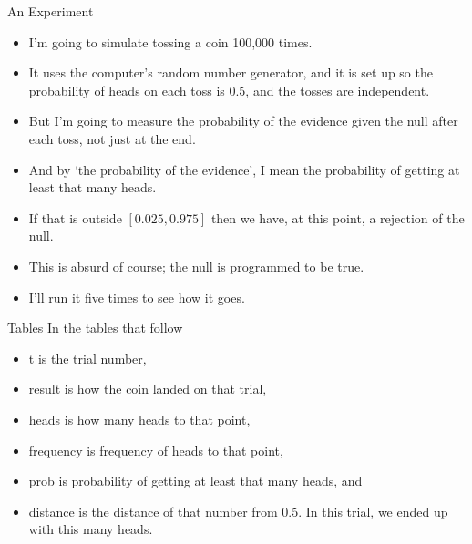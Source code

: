 \documentclass[
  ignorenonframetext,
]{beamer}
\providecommand{\tightlist}{%
  \setlength{\itemsep}{0pt}\setlength{\parskip}{0pt}}
\renewcommand{\,}{\text{, }}
\begin{document}
\begin{frame}{An Experiment}
\protect\hypertarget{an-experiment-1}{}
\begin{itemize}
\tightlist
\item
  I'm going to simulate tossing a coin 100,000 times.
\item
  It uses the computer's random number generator, and it is set up so
  the probability of heads on each toss is 0.5, and the tosses are
  independent.
\item
  But I'm going to measure the probability of the evidence given the
  null after each toss, not just at the end.
\item
  And by `the probability of the evidence', I mean the probability of
  getting at least that many heads.
\item
  If that is outside \([0.025, 0.975]\) then we have, at this point, a
  rejection of the null.
\item
  This is absurd of course; the null is programmed to be true.
\item
  I'll run it five times to see how it goes.
\end{itemize}
\end{frame}

\begin{frame}{Tables}
\protect\hypertarget{tables}{}
In the tables that follow

\begin{itemize}
\tightlist
\item
  t is the trial number,
\item
  result is how the coin landed on that trial,
\item
  heads is how many heads to that point,
\item
  frequency is frequency of heads to that point,
\item
  prob is probability of getting at least that many heads, and
\item
  distance is the distance of that number from 0.5. In this trial, we
  ended up with this many heads.
\end{itemize}
\end{frame}
\end{document}
